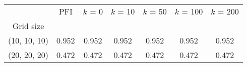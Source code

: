 \begin{tabular}{ccccccc}
\toprule
{} &    PFI &  $k$ = 0 &  $k$ = 10 &  $k$ = 50 &  $k$ = 100 &  $k$ = 200 \\
Grid size    &        &          &           &           &            &            \\
\midrule
(10, 10, 10) &  0.952 &    0.952 &     0.952 &     0.952 &      0.952 &      0.952 \\
(20, 20, 20) &  0.472 &    0.472 &     0.472 &     0.472 &      0.472 &      0.472 \\
\bottomrule
\end{tabular}

